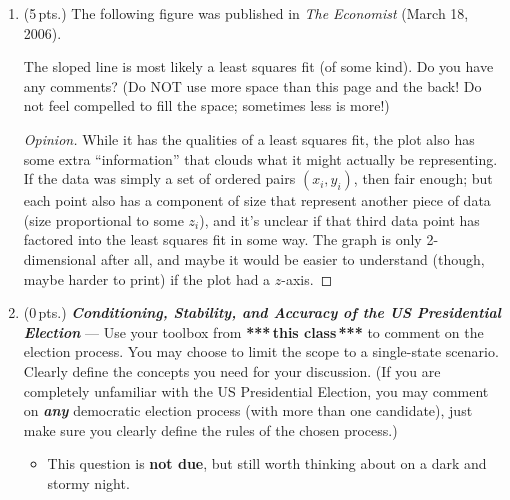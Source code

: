 \documentclass[12pt]{article}
\newcommand{\parens}[1]{\left(#1\right)}
\newcommand{\bfit}[1]{\textbf{\textit{#1}}}
\begin{document}
\begin{enumerate}
\begin{enumerate}
   \end{enumerate}


\item (5\,pts.)
  The following figure was published in \emph{The Economist} (March
  18, 2006).\\

  \centerline{
  }

  The sloped line is most likely a least squares fit (of some kind).
  Do you have any comments?  (Do NOT use more space than this page and
  the back!  Do not feel compelled to fill the space; sometimes less
  is more!)
  \begin{proof}[Opinion]
  While it has the qualities of a least squares fit, the plot also has some extra ``information'' that clouds what it might actually be representing. If the data was simply a set of ordered pairs $\parens{x_i, y_i}$, then fair enough; but each point also has a component of size that represent another piece of data (size proportional to some $z_i$), and it's unclear if that third data point has factored into the least squares fit in some way. The graph is only 2-dimensional after all, and maybe it would be easier to understand (though, maybe harder to print) if the plot had a $z$-axis.
  \end{proof}



\item (0\,pts.) \bfit{Conditioning, Stability, and
    Accuracy of the US Presidential Election} --- Use your toolbox
  from \textbf{***\,this class\,***} to comment on the election
  process.  You may choose to limit the scope to a single-state
  scenario.  Clearly define the concepts you need for your discussion.
  (If you are completely unfamiliar with the US Presidential Election,
  you may comment on \textbf{\textit{any}} democratic election process
  (with more than one candidate), just make sure you clearly define
  the rules of the chosen process.)

  \begin{itemize}
  \item This question is \textbf{not due}, but still worth thinking
    about on a dark and stormy night.
  \end{itemize}
\end{enumerate}
\end{document}
